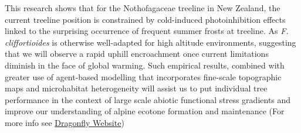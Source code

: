 \documentclass[12pt]{article}
\begin{document}
\noindent This research shows that for the Nothofagaceae treeline in New Zealand, the current treeline position is constrained by cold-induced photoinhibition effects linked to the surprising occurrence of frequent summer frosts at treeline. As \textit{F. cliffortioides} is otherwise well-adapted for high altitude environments, suggesting that we will observe a rapid uphill encroachment once current limitations diminish in the face of global warming. Such empirical results, combined with greater use of agent-based modelling that incorporates fine-scale topographic maps and microhabitat heterogeneity will assist us to put individual tree performance in the context of large scale abiotic functional stress gradients and improve our understanding of alpine ecotone formation and maintenance (For more info see \href{www.dragonfly.co.nz}{Dragonfly Website})



\printbibliography
\end{document}
